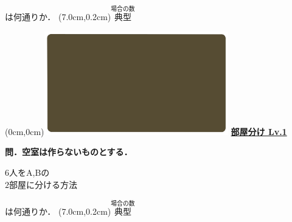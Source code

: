\documentclass[10pt,
fleqn,
dvipdfmx,
uplatex
]{jsarticle}
\begin{document}
\large
\vspace{0.1zw}
\hfill は何通りか．
\at(7.0cm,0.2cm){\small\color{bradorange}$\overset{\text{場合の数}}{\text{典型}}$}


\newpage



\at(0cm,0cm){\includegraphics[width=8cm,bb=0 0 1920 1080]{./youtube/thumbnails/templates/smart_background/場合の数.jpeg}}
{\color{orange}\bf\boldmath\huge\underline{部屋分け Lv.1 }}\vspace{0.3zw}

\large 
\bf\boldmath 問．空室は作らないものとする．

\Huge
\vspace{-0.3zw}
\hspace{0.1zw} $6$人をA,\;Bの\vspace{-0.2zw}\\
\hfill$2$部屋に分ける方法\hspace{0.1zw} 

\large
\vspace{0.1zw}
\hfill は何通りか．
\at(7.0cm,0.2cm){\small\color{bradorange}$\overset{\text{場合の数}}{\text{典型}}$}
\end{document}
